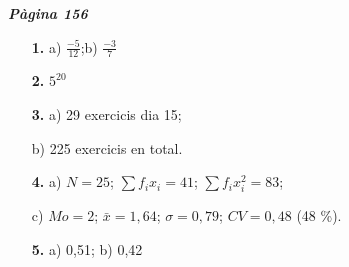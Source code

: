 \documentclass[a4paper, pdf, twoside]{book}
\begin{document}
\begin{multicols}{2}
{\textbf{\em Pàgina 156}} \hrulefill
\begin{enumerate}
\vspace{0.25cm}
\item[\fontfamily{phv}\selectfont\color{blue}\textbf{1. }]  \scalebox{0.6}{\simbolclau } 
 a) $\frac {-5}{12}$;\quad b) $\frac {-3}{7}$
 \end{enumerate}
\begin{enumerate}
\vspace{0.25cm}
\item[\fontfamily{phv}\selectfont\color{blue}\textbf{2. }]  \scalebox{0.6}{\simbolclau } 
 $5^{20}$
\vspace{0.25cm}
\item[\fontfamily{phv}\selectfont\color{blue}\textbf{3. }]  \scalebox{0.6}{\simbolclau } 
a) 29 exercicis dia 15; \par b) 225 exercicis en total.
\vspace{0.25cm}
\item[\fontfamily{phv}\selectfont\color{blue}\textbf{4. }]  \scalebox{0.6}{\simbolclau } 
 a) $N=25$; $\sum f_i x_i = 41$; $\sum f_i x_i^2 =83$;\par c) $Mo=2$; $\bar x=1,64$; $\sigma =0,79$; $CV=0,48$ (48 \%).
\vspace{0.25cm}
\item[\fontfamily{phv}\selectfont\color{blue}\textbf{5. }]  \scalebox{0.6}{\simbolclau } 
 a) 0,51; b) 0,42
 \end{enumerate}
\vspace{0.3cm}



\end{multicols}
\end{document}
